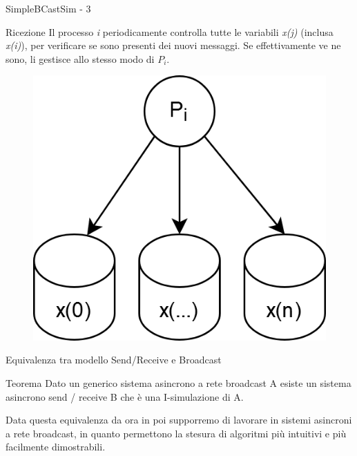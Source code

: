 \documentclass{beamer}
\begin{document}
    \begin{frame}{SimpleBCastSim - 3}
        \begin{block}{Ricezione}
            Il processo \textit{i} periodicamente controlla tutte le variabili \textit{x(j)} (inclusa \textit{x(i)}), per verificare se sono presenti dei nuovi messaggi. Se effettivamente ve ne sono, li gestisce allo stesso modo di $P_{i}$.
            \begin{figure}
                \centering
                \includegraphics[scale=0.26]{BroadcastReceive.png}
            \end{figure}
        \end{block}
    \end{frame}


    \begin{frame}{Equivalenza tra modello Send/Receive e Broadcast}
        \begin{block}{Teorema}
            Dato un generico sistema asincrono a rete broadcast A esiste un sistema asincrono send / receive B che è una I-simulazione di A.
        \end{block}

        \vspace{0.5cm}

        Data questa equivalenza da ora in poi supporremo di lavorare in sistemi asincroni a rete broadcast, in quanto permettono la stesura di algoritmi più intuitivi e più facilmente dimostrabili.
    \end{frame}
\end{document}
